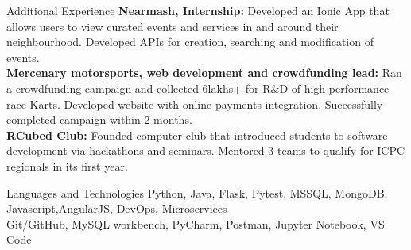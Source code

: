 \documentclass{resume} %
\begin{document}
\begin{rSection}{Additional Experience} 
{\bf Nearmash, Internship:} Developed an Ionic App that allows users to view curated events and services in and around their neighbourhood. Developed APIs for creation, searching and modification of events.
\\{\bf Mercenary motorsports, web development and crowdfunding lead:} Ran a crowdfunding campaign and collected 6lakhs+ for R\&D of high performance race Karts. Developed website with online payments integration. Successfully completed campaign within 2 months.
\\{\bf RCubed Club:} Founded computer club that introduced students to software development via hackathons and seminars. Mentored 3 teams to qualify for ICPC regionals in its first year.
\end{rSection}

\begin{rSection}{Languages and Technologies}
Python, Java, Flask, Pytest, MSSQL, MongoDB, Javascript,AngularJS, DevOps, Microservices \\
Git/GitHub, MySQL workbench, PyCharm, Postman, Jupyter Notebook, VS Code \\
\end{rSection}

\end{document}
